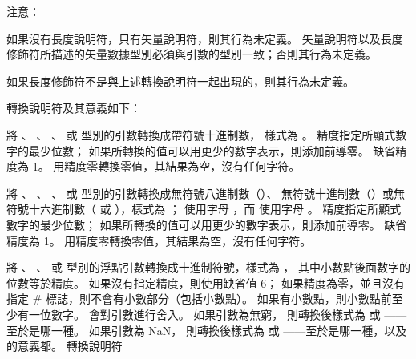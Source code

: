 注意：

如果沒有長度說明符，只有矢量說明符，則其行為未定義。
矢量說明符以及長度修飾符所描述的矢量數據型別必須與引數的型別一致；否則其行為未定義。

如果長度修飾符不是與上述轉換說明符一起出現的，則其行為未定義。

轉換說明符及其意義如下：

將 、 、 、
  或  型別的引數轉換成帶符號十進制數，
樣式為 。
精度指定所顯式數字的最少位數；
如果所轉換的值可以用更少的數字表示，則添加前導零。
缺省精度為 1。
用精度零轉換零值，其結果為空，沒有任何字符。
\stopclSpecifier

將 、 、 、
  或  型別的引數轉換成無符號八進制數（）、
無符號十進制數（）或無符號十六進制數（ 或 ），樣式為 ；
 使用字母 ，而  使用字母 。
精度指定所顯式數字的最少位數；
如果所轉換的值可以用更少的數字表示，則添加前導零。
缺省精度為 1。
用精度零轉換零值，其結果為空，沒有任何字符。
\stopclSpecifier

將 、 、 
 或  型別的浮點引數轉換成十進制符號，樣式為 ，
其中小數點後面數字的位數等於精度。
如果沒有指定精度，則使用缺省值 6；
如果精度為零，並且沒有指定 \# 標誌，則不會有小數部分（包括小數點）。
如果有小數點，則小數點前至少有一位數字。
會對引數進行舍入。
如果引數為無窮，
則轉換後樣式為  或 ——至於是哪一種。
如果引數為 NaN，
則轉換後樣式為  或 
——至於是哪一種，以及的意義都。
轉換說明符  
\stopclSpecifier

